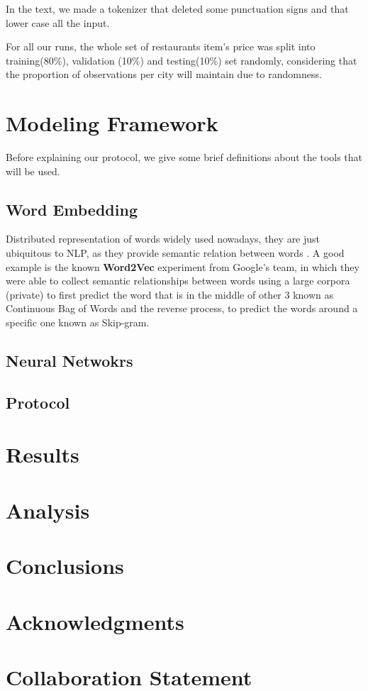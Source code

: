 \documentclass[11pt,letterpaper]{article}
\begin{document}
In the text, we made a tokenizer that deleted some punctuation signs and that lower case all the input.

For all our runs, the whole set of restaurants item's price was split into training(80\%), validation (10\%) and testing(10\%) set randomly, considering that the proportion of observations per city will maintain due to randomness. 

\section{Modeling Framework}
Before explaining our protocol, we give some brief definitions about the tools that will be used.
\subsection{Word Embedding}
Distributed representation of words widely used nowadays, they are just ubiquitous to NLP, as they provide semantic relation between words \cite{hill2016learning}.  A good example is the known \textbf{Word2Vec} experiment from Google's team, in which they were able to collect semantic relationships between words using a large corpora (private) to first predict the word that is in the middle of other 3 known as Continuous Bag of Words and the reverse process, to predict the words around a specific one known as Skip-gram. \cite{mikolov2013distributed,mikolov2013efficient}

\subsection{Neural Netwokrs}

\subsection{ Protocol}

\section{Results}
\section{Analysis}
\section{Conclusions}
\section*{Acknowledgments}

\section*{Collaboration Statement}




\end{document}
